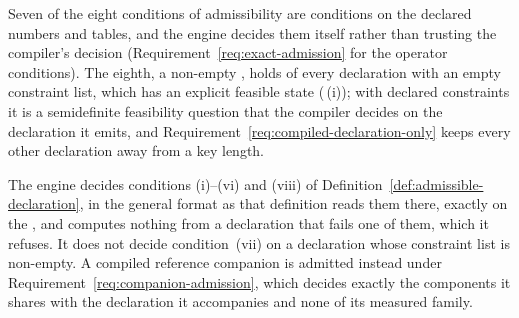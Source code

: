 
Seven of the eight conditions of admissibility are conditions on the
declared numbers and tables, and the engine decides them itself rather than
trusting the compiler's decision
(Requirement~\ref{req:exact-admission} for the operator conditions). The
eighth, a non-empty , holds of every declaration with an empty
constraint list, which has an explicit feasible state
(\,(i)); with declared constraints it
is a semidefinite feasibility question that the compiler decides on the
declaration it emits, and Requirement~\ref{req:compiled-declaration-only}
keeps every other declaration away from a key length.

\begin{requirement}\label{req:declaration-admission}
The engine decides conditions (i)--(vi) and (viii) of
Definition~\ref{def:admissible-declaration}, in the general format as that
definition reads them there, exactly on the , and
computes nothing from a declaration that fails one of them, which it
refuses. It does not decide condition~(vii) on a declaration whose
constraint list is non-empty. A compiled reference companion is admitted
instead under Requirement~\ref{req:companion-admission}, which decides
exactly the components it shares with the declaration it accompanies and
none of its measured family.
\end{requirement}
